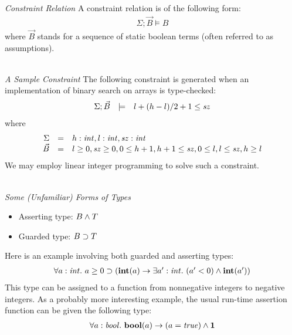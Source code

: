 \documentclass[pdf]{prosper}
\begin{document}
\def\vB{\vec{B}}
\def\temd{\models}
\begin{slide}{\em Constraint Relation}
A constraint relation is of the following form:
\[\begin{array}{c}
\Sigma;\vB\temd B
\end{array}\]
where $\vB$ stands for a sequence of static boolean terms
(often referred to as assumptions).\\~\\
\end{slide}
\begin{slide}{\em A Sample Constraint}
\def\sz{{\it sz}}
The following constraint is generated when an
implementation of binary search on arrays is type-checked:
\[\begin{array}{rcl}
\Sigma;\vB & \temd & l+(h-l)/2+1\leq \sz \\
\end{array}\]
where
\[\begin{array}{rcl}
\Sigma & = & h:\sint, l:\sint, \sz:\sint \\
\vB & = & l\geq 0, \sz\geq 0, 0\leq h+1, h+1\leq \sz, 0\leq l, l\leq \sz, h\geq l \\
\end{array}\]
We may employ linear integer programming to solve such a constraint.\\~\\
\end{slide}
\begin{slide}{\em Some (Unfamiliar) Forms of Types}
\begin{itemize}
\item Asserting type: $B\land T$
\item Guarded type: $B\supset T$
\end{itemize}
Here is an example involving both guarded and asserting types:
\[\begin{array}{l}
\forall a:{\it int}.~a \geq 0\supset (\mbox{\bf int} (a) \rightarrow \exists a':{\it int}.~(a'<0)\land \mbox{\bf int}(a')) \\
\end{array}\]
This type can be assigned to a function from nonnegative integers to
negative integers. As a probably more interesting example, the usual
run-time assertion function can be given the following type:
\[\begin{array}{l}
\forall a:{\it bool}.~\mbox{\bf bool}(a)\rightarrow(a={\it true})\land{\mathbf 1} \\
\end{array}\]
\vfill
\end{slide}
\end{document}
